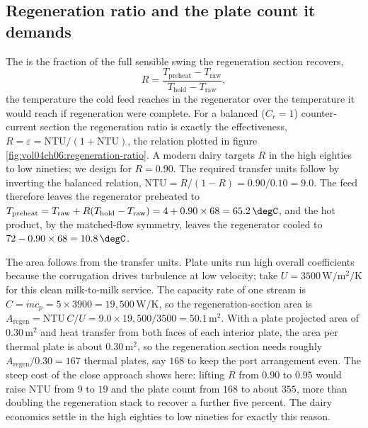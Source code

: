 

\subsection{Regeneration ratio and the plate count it demands}

The  is the fraction of the full sensible swing the
regeneration section recovers,
\[
R = \frac{T_{\text{preheat}} - T_{\text{raw}}}{T_{\text{hold}} - T_{\text{raw}}},
\]
the temperature the cold feed reaches in the regenerator over the temperature it
would reach if regeneration were complete. For a balanced ($C_r = 1$)
counter-current section the regeneration ratio is exactly the effectiveness,
$R = \varepsilon = \text{NTU}/(1 + \text{NTU})$, the relation plotted in figure
\ref{fig:vol04ch06:regeneration-ratio}. A modern dairy targets $R$ in the high
eighties to low nineties; we design for $R = 0.90$. The required transfer units
follow by inverting the balanced relation, $\text{NTU} = R/(1 - R) = 0.90/0.10 =
9.0$. The feed therefore leaves the regenerator preheated to $T_{\text{preheat}}
= T_{\text{raw}} + R(T_{\text{hold}} - T_{\text{raw}}) = 4 + 0.90\times 68 =
65.2\,\degC$, and the hot product, by the matched-flow symmetry, leaves the
regenerator cooled to $72 - 0.90\times 68 = 10.8\,\degC$.



The area follows from the transfer units. Plate units run high overall
coefficients because the corrugation drives turbulence at low velocity; take
$U = 3500\,\si{\watt\per\meter\squared\per\kelvin}$ for this clean milk-to-milk
service. The capacity rate of one stream is $C = \dot{m} c_p = 5\times 3900 =
19{,}500\,\si{\watt\per\kelvin}$, so the regeneration-section area is $A_{\text{
regen}} = \text{NTU}\,C/U = 9.0\times 19{,}500/3500 = 50.1\,\text{m}^2$. With a
plate projected area of $0.30\,\text{m}^2$ and heat transfer from both faces of
each interior plate, the area per thermal plate is about $0.30\,\text{m}^2$, so
the regeneration section needs roughly $A_{\text{regen}}/0.30 = 167$ thermal
plates, say $168$ to keep the port arrangement even. The steep cost of the close
approach shows here: lifting $R$ from $0.90$ to $0.95$ would raise NTU from $9$
to $19$ and the plate count from $168$ to about $355$, more than doubling the
regeneration stack to recover a further five percent. The dairy economics settle
in the high eighties to low nineties for exactly this reason.

